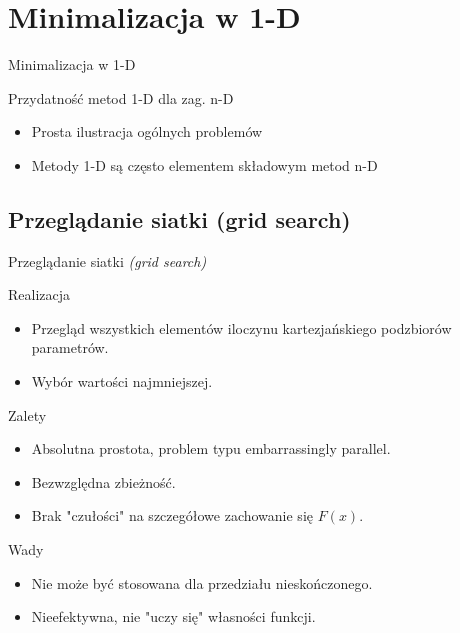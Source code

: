 \section{Minimalizacja w 1-D}
  \begin{frame}{Minimalizacja w 1-D}
    \begin{block}{Przydatność metod 1-D dla zag. n-D}
      \begin{itemize}
        \item Prosta ilustracja ogólnych problemów
        \item Metody 1-D są często elementem składowym metod n-D

      \end{itemize}

    \end{block}

  \end{frame}

\subsection{Przeglądanie siatki (grid search)}
  \begin{frame}{Przeglądanie siatki \emph{(grid search)}}
    \begin{block}{Realizacja}
      \begin{itemize}
        \item Przegląd wszystkich elementów iloczynu kartezjańskiego podzbiorów parametrów.
        \item Wybór wartości najmniejszej.
      \end{itemize}
    \end{block}

    \begin{block}{Zalety}
      \begin{itemize}
        \item Absolutna prostota, problem typu embarrassingly parallel.
        \item Bezwzględna zbieżność.
        \item Brak "czułości" na szczegółowe zachowanie się $F(x)$.
      \end{itemize}
    \end{block}

    \begin{block}{Wady}
      \begin{itemize}
        \item Nie może być stosowana dla przedziału nieskończonego.
        \item Nieefektywna, nie "uczy się" własności funkcji.
      \end{itemize}
    \end{block}
  \end{frame}

